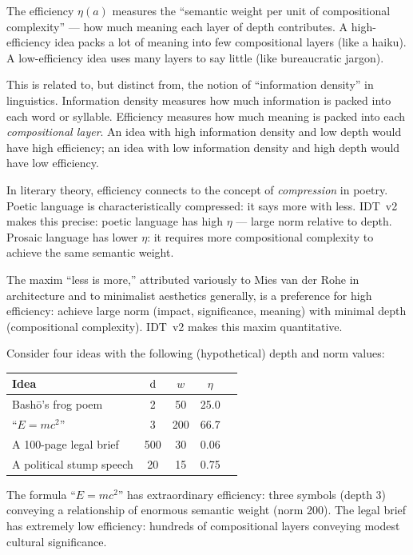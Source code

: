 \begin{interpretation}
\label{interp:efficiency}
The efficiency $\eta(a)$ measures the ``semantic weight per unit of
compositional complexity'' --- how much meaning each layer of depth contributes.
A high-efficiency idea packs a lot of meaning into few compositional layers
(like a haiku). A low-efficiency idea uses many layers to say little (like
bureaucratic jargon).

This is related to, but distinct from, the notion of ``information density'' in
linguistics. Information density measures how much information is packed into
each word or syllable. Efficiency measures how much meaning is packed into each
\emph{compositional layer}. An idea with high information density and low depth
would have high efficiency; an idea with low information density and high depth
would have low efficiency.

In literary theory, efficiency connects to the concept of \emph{compression} in
poetry. Poetic language is characteristically compressed: it says more with less.
IDT~v2 makes this precise: poetic language has high $\eta$ --- large norm
relative to depth. Prosaic language has lower $\eta$: it requires more
compositional complexity to achieve the same semantic weight.

The maxim ``less is more,'' attributed variously to Mies van der Rohe in
architecture and to minimalist aesthetics generally, is a preference for high
efficiency: achieve large norm (impact, significance, meaning) with minimal
depth (compositional complexity). IDT~v2 makes this maxim quantitative.
\end{interpretation}

\begin{example}
\label{ex:efficiency}
Consider four ideas with the following (hypothetical) depth and norm values:
\begin{center}
\begin{tabular}{lcccc}
\textbf{Idea} & $\operatorname{d}$ & $w$ & $\eta$ \\
\hline
Bash\=o's frog poem & 2 & 50 & 25.0 \\
``$E = mc^2$'' & 3 & 200 & 66.7 \\
A 100-page legal brief & 500 & 30 & 0.06 \\
A political stump speech & 20 & 15 & 0.75 \\
\end{tabular}
\end{center}
The formula ``$E = mc^2$'' has extraordinary efficiency: three symbols (depth 3)
conveying a relationship of enormous semantic weight (norm 200). The legal brief
has extremely low efficiency: hundreds of compositional layers conveying modest
cultural significance.
\end{example}

